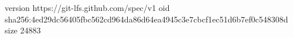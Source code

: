 version https://git-lfs.github.com/spec/v1
oid sha256:4ed29dc56405fbc562cd964da86d64ea4945c3e7cbcf1ec51d6b7ef0c548308d
size 24883
